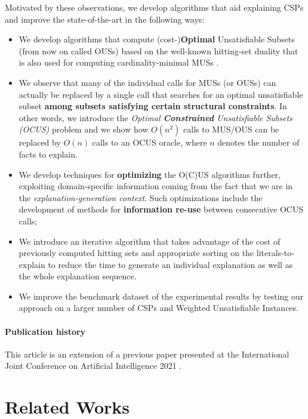 \documentclass[twoside,11pt]{article}
\begin{document}
Motivated by these observations, we develop algorithms that aid explaining CSPs and improve the state-of-the-art in the following ways: 
\begin{itemize}
\item We develop algorithms that compute (cost-)\textbf{Optimal} Unsatisfiable Subsets (from now on called OUSs) based on the well-known hitting-set duality that is also used for computing cardinality-minimal MUSs \cite{ignatiev2015smallest,DBLP:conf/kr/SaikkoWJ16}.
\item We observe that many of the individual calls for MUSs (or OUSs) can actually be replaced by a single call that searches for an optimal unsatisfiable subset \textbf{among subsets satisfying certain structural constraints}. In other words, we introduce the \emph{Optimal \textbf{Constrained} Unsatisfiable Subsets (OCUS)} problem and we show how $O(n^2)$ calls to MUS/OUS can be replaced by $O(n)$ calls to an OCUS oracle, where $n$ denotes the number of facts to explain. 
\item We develop techniques for \textbf{optimizing} the O(C)US algorithms further, exploiting domain-specific information coming from the fact that we are in the \emph{explanation-generation context}. Such optimizations include the development of methods for \textbf{information re-use} between consecutive OCUS calls;
\item We introduce an iterative algorithm that takes advantage of the cost of previously computed hitting sets and appropriate sorting on the literals-to-explain to reduce the time to generate an individual explanation as well as the whole explanation sequence.
\item We improve the benchmark dataset of the experimental results by testing our approach on a larger number of CSPs and Weighted Unsatisfiable Instances.
\end{itemize}

\paragraph*{Publication history} This article is an extension of a previous paper presented at the International Joint Conference on Artificial Intelligence 2021 \cite{ijcai2021}.

\section{Related Works}
\label{sec:related-works}
\end{document}
